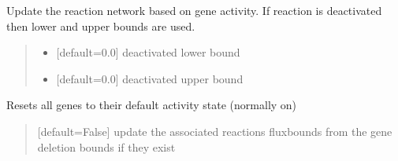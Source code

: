 \documentclass[letterpaper,12pt,english]{sphinxmanual}
\begin{document}
\begin{fulllineitems}
\begin{fulllineitems}
\label{\detokenize{api/core:cbmpy.CBModel.Model.updateNetwork}}
\pysigstartsignatures
\pysiglinewithargsret
{}
{\sphinxparamcomma {}\sphinxparamcomma {}}
{}
\pysigstopsignatures
\sphinxAtStartPar
Update the reaction network based on gene activity. If reaction is deactivated then lower and upper bounds are used.
\begin{quote}\begin{description}
\begin{itemize}
\item {} 
\sphinxAtStartPar
{} \textendash{} {[}default=0.0{]} deactivated lower bound

\item {} 
\sphinxAtStartPar
{} \textendash{} {[}default=0.0{]} deactivated upper bound

\end{itemize}

\end{description}\end{quote}

\end{fulllineitems}


\begin{fulllineitems}
\label{\detokenize{api/core:cbmpy.CBModel.Model.resetAllGenes}}
\pysigstartsignatures
\pysiglinewithargsret
{}
{}
{}
\pysigstopsignatures
\sphinxAtStartPar
Resets all genes to their default activity state (normally on)
\begin{quote}\begin{description}
\sphinxAtStartPar
{} \textendash{} {[}default=False{]} update the associated reactions fluxbounds from the gene deletion bounds if they exist

\end{description}\end{quote}


\end{fulllineitems}
\end{fulllineitems}
\end{document}
